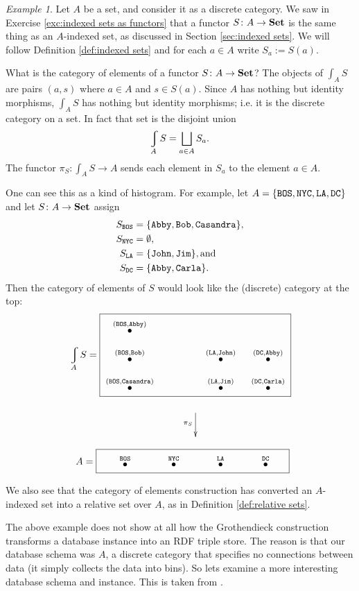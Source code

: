 \documentclass{book}
\def\tn{\textnormal}
\def\hsp{\hspace{.3in}}
\def\to{\rightarrow}
\def\taking{\colon}
\newcommand{\LTO}[1]{\stackrel{\tt{#1}}{\bullet}}
\def\Set{{\bf Set}}
\theoremstyle{remark}
\newtheorem{example}[subsubsection]{Example}
\theoremstyle{definition}
\begin{document}
\begin{example}

Let $A$ be a set, and consider it as a discrete category. We saw in Exercise \ref{exc:indexed sets as functors} that a functor $S\taking A\to\Set$ is the same thing as an $A$-indexed set, as discussed in Section \ref{sec:indexed sets}. We will follow Definition \ref{def:indexed sets} and for each $a\in A$ write $S_a:=S(a)$.

What is the category of elements of a functor $S\taking A\to\Set$? The objects of $\int_AS$ are pairs $(a,s)$ where $a\in A$ and $s\in S(a)$. Since $A$ has nothing but identity morphisms, $\int_AS$ has nothing but identity morphisms; i.e. it is the discrete category on a set. In fact that set is the disjoint union $$\varint_AS=\bigsqcup_{a\in A}S_a.$$ The functor $\pi_S\taking\int_AS\to A$ sends each element in $S_a$ to the element $a\in A$. 

One can see this as a kind of histogram. For example, let $A=\{{\tt BOS, NYC, LA, DC}\}$ and let $S\taking A\to\Set$ assign 
\begin{align*}
S_{{\tt BOS}}&=\{{\tt Abby, Bob, Casandra}\},\\
S_{\tt NYC}&=\emptyset,\\
S_{\tt LA}&=\{{\tt John, Jim}\}, \tn{and}\\
S_{\tt DC}&=\{{\tt Abby,Carla}\}.
\end{align*}
Then the category of elements of $S$ would look like the (discrete) category at the top: 
\begin{align}\label{dia:elements for cities}
\varint_AS=\parbox{2.7in}{\fbox{\xymatrix@=10pt{
\LTO{(BOS,Abby)}\\
\LTO{(BOS,Bob)}&\hspace{.3in}&\LTO{(LA,John)}&\LTO{(DC,Abby)}\\
\LTO{(BOS,Casandra)}&&\LTO{(LA,Jim)}&\LTO{(DC,Carla)}
}}}
\end{align}
$$
\hsp\xymatrix{~\ar[d]_{\pi_S}\\~}
$$
$$
\;\;A=\fbox{\xymatrix@=33pt{\hspace{.25in}\LTO{BOS}&\LTO{NYC}&\LTO{LA}&\LTO{DC}\hspace{.2in}}}
$$

We also see that the category of elements construction has converted an $A$-indexed set into a relative set over $A$, as in Definition \ref{def:relative sets}.

\end{example}

The above example does not show at all how the Grothendieck construction transforms a database instance into an RDF triple store. The reason is that our database schema was $A$, a discrete category that specifies no connections between data (it simply collects the data into bins). 
So lets examine a more interesting database schema and instance. This is taken from \cite{Sp2}.
\end{document}
